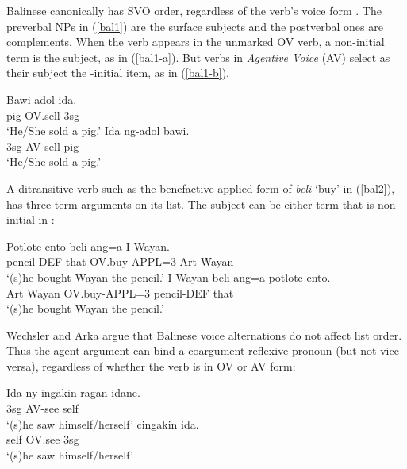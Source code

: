 \documentclass[output=paper
                ,modfonts
                ,nonflat
	        ,collection
	        ,collectionchapter
	        ,collectiontoclongg
 	        ,biblatex
                ,babelshorthands
                ,newtxmath
                ,draftmode
                ,colorlinks, citecolor=brown
]{./langsci/langscibook}
\begin{document}
 Balinese canonically has SVO order, regardless of the verb's voice form \citep{Artawa1994, Wechsler+Arka:1998}.  The preverbal NPs in  (\ref{bal1}) are the surface subjects and the postverbal ones are complements.  When the verb appears in the unmarked OV verb, a non-initial term is the subject, as in (\ref{bal1-a}).    But verbs in \emph{Agentive Voice} (AV) select as their subject the \argst{}-initial item, as in (\ref{bal1-b}).  

\begin{exe}
	\ex\label{bal1}
\begin{xlist}
\ex \label{bal1-a}	\gll Bawi adol ida.  \\
		pig OV.sell 3sg   \\
		\glt `He/She sold a pig.'
\ex	\label{bal1-b}\gll Ida ng-adol bawi.  \\
		3sg AV-sell pig   \\
		\glt `He/She sold a pig.'
\end{xlist}
\end{exe} 

\noindent
A ditransitive verb  such as the benefactive applied form of \textit{beli} `buy' in (\ref{bal2}), has three term arguments on its \argst list.  The subject can be either term that is non-initial in \argst{}:

\begin{exe}
	\ex\label{bal2}
\begin{xlist}
\ex 	\gll Potlote ento beli-ang=a I Wayan.  \\
		pencil-DEF that OV.buy-APPL=3 Art Wayan   \\
		\glt `(s)he bought Wayan the pencil.'
\ex 	\gll I Wayan beli-ang=a potlote ento.   \\
		Art Wayan OV.buy-APPL=3 pencil-DEF that   \\
		\glt `(s)he bought Wayan the pencil.'
\end{xlist}
\end{exe} 

\noindent
Wechsler and Arka argue that Balinese voice alternations  do not affect \argst list order. 
Thus the agent argument can bind a coargument reflexive pronoun (but not vice versa), regardless of whether the verb is in OV or AV form:

\begin{exe}
	\ex\label{bal3}
\begin{xlist}
\ex 	\gll Ida ny-ingakin ragan idane. \\
		3sg AV-see self\\
		\glt ‘(s)he saw himself/herself’
\ex 	{} cingakin ida. \\
		self OV.see 3sg \\
		\glt ‘(s)he saw himself/herself’
\end{xlist}
\end{exe} 
\end{document}
